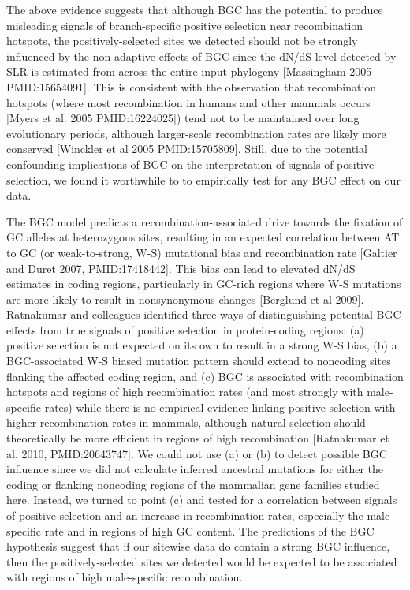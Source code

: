 The above evidence suggests that although BGC has the potential to
produce misleading signals of branch-specific positive selection near
recombination hotspots, the positively-selected sites we detected
should not be strongly influenced by the non-adaptive effects of BGC
since the dN/dS level detected by SLR is estimated from across the
entire input phylogeny [Massingham 2005 PMID:15654091]. This is
consistent with the observation that recombination hotspots (where
most recombination in humans and other mammals occurs [Myers et
  al. 2005 PMID:16224025]) tend not to be maintained over long
evolutionary periods, although larger-scale recombination rates are
likely more conserved [Winckler et al 2005 PMID:15705809]. Still, due
to the potential confounding implications of BGC on the interpretation
of signals of positive selection, we found it worthwhile to to
empirically test for any BGC effect on our data.

The BGC model predicts a recombination-associated drive towards the
fixation of GC alleles at heterozygous sites, resulting in an expected
correlation between AT to GC (or weak-to-strong, W-S) mutational bias
and recombination rate [Galtier and Duret 2007, PMID:17418442]. This
bias can lead to elevated dN/dS estimates in coding regions,
particularly in GC-rich regions where W-S mutations are more likely to
result in nonsynonymous changes [Berglund et al 2009]. Ratnakumar and
colleagues identified three ways of distinguishing potential BGC
effects from true signals of positive selection in protein-coding
regions: (a) positive selection is not expected on its own to result
in a strong W-S bias, (b) a BGC-associated W-S biased mutation pattern
should extend to noncoding sites flanking the affected coding region,
and (c) BGC is associated with recombination hotspots and regions of
high recombination rates (and most strongly with male-specific rates)
while there is no empirical evidence linking positive selection with
higher recombination rates in mammals, although natural selection
should theoretically be more efficient in regions of high
recombination [Ratnakumar et al. 2010, PMID:20643747]. We could not
use (a) or (b) to detect possible BGC influence since we did not
calculate inferred ancestral mutations for either the coding or
flanking noncoding regions of the mammalian gene families studied
here. Instead, we turned to point (c) and tested for a correlation
between signals of positive selection and an increase in recombination
rates, especially the male-specific rate and in regions of high GC
content. The predictions of the BGC hypothesis suggest that if our
sitewise data do contain a strong BGC influence, then the
positively-selected sites we detected would be expected to be
associated with regions of high male-specific recombination.

